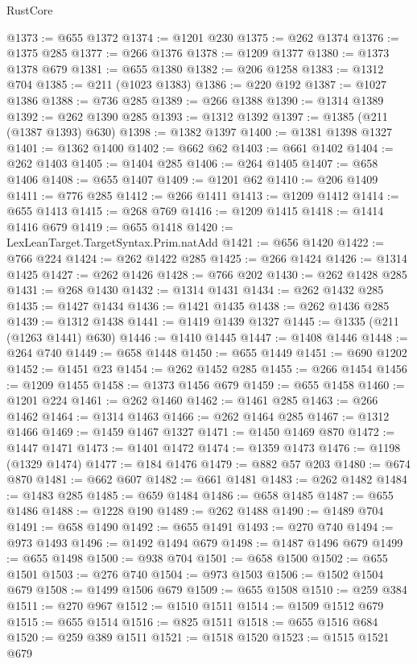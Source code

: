 \begin{lexlean}{RustCore}
\begin{coremodule}
@1373 := @655 @1372
@1374 := @1201 @230
@1375 := @262 @1374
@1376 := @1375 @285
@1377 := @266 @1376
@1378 := @1209 @1377
@1380 := @1373 @1378 @679
@1381 := @655 @1380
@1382 := @206 @1258
@1383 := @1312 @704
@1385 := @211 (@1023 @1383)
@1386 := @220 @192
@1387 := @1027 @1386
@1388 := @736 @285
@1389 := @266 @1388
@1390 := @1314 @1389
@1392 := @262 @1390 @285
@1393 := @1312 @1392
@1397 := @1385 (@211 (@1387 @1393) @630)
@1398 := @1382 @1397
@1400 := @1381 @1398 @1327
@1401 := @1362 @1400
@1402 := @662 @62
@1403 := @661 @1402
@1404 := @262 @1403
@1405 := @1404 @285
@1406 := @264 @1405
@1407 := @658 @1406
@1408 := @655 @1407
@1409 := @1201 @62
@1410 := @206 @1409
@1411 := @776 @285
@1412 := @266 @1411
@1413 := @1209 @1412
@1414 := @655 @1413
@1415 := @268 @769
@1416 := @1209 @1415
@1418 := @1414 @1416 @679
@1419 := @655 @1418
@1420 := LexLeanTarget.TargetSyntax.Prim.natAdd
@1421 := @656 @1420
@1422 := @766 @224
@1424 := @262 @1422 @285
@1425 := @266 @1424
@1426 := @1314 @1425
@1427 := @262 @1426
@1428 := @766 @202
@1430 := @262 @1428 @285
@1431 := @268 @1430
@1432 := @1314 @1431
@1434 := @262 @1432 @285
@1435 := @1427 @1434
@1436 := @1421 @1435
@1438 := @262 @1436 @285
@1439 := @1312 @1438
@1441 := @1419 @1439 @1327
@1445 := @1335 (@211 (@1263 @1441) @630)
@1446 := @1410 @1445
@1447 := @1408 @1446
@1448 := @264 @740
@1449 := @658 @1448
@1450 := @655 @1449
@1451 := @690 @1202
@1452 := @1451 @23
@1454 := @262 @1452 @285
@1455 := @266 @1454
@1456 := @1209 @1455
@1458 := @1373 @1456 @679
@1459 := @655 @1458
@1460 := @1201 @224
@1461 := @262 @1460
@1462 := @1461 @285
@1463 := @266 @1462
@1464 := @1314 @1463
@1466 := @262 @1464 @285
@1467 := @1312 @1466
@1469 := @1459 @1467 @1327
@1471 := @1450 @1469 @870
@1472 := @1447 @1471
@1473 := @1401 @1472
@1474 := @1359 @1473
@1476 := @1198 (@1329 @1474)
@1477 := @184 @1476
@1479 := @882 @57 @203
@1480 := @674 @870
@1481 := @662 @607
@1482 := @661 @1481
@1483 := @262 @1482
@1484 := @1483 @285
@1485 := @659 @1484
@1486 := @658 @1485
@1487 := @655 @1486
@1488 := @1228 @190
@1489 := @262 @1488
@1490 := @1489 @704
@1491 := @658 @1490
@1492 := @655 @1491
@1493 := @270 @740
@1494 := @973 @1493
@1496 := @1492 @1494 @679
@1498 := @1487 @1496 @679
@1499 := @655 @1498
@1500 := @938 @704
@1501 := @658 @1500
@1502 := @655 @1501
@1503 := @276 @740
@1504 := @973 @1503
@1506 := @1502 @1504 @679
@1508 := @1499 @1506 @679
@1509 := @655 @1508
@1510 := @259 @384
@1511 := @270 @967
@1512 := @1510 @1511
@1514 := @1509 @1512 @679
@1515 := @655 @1514
@1516 := @825 @1511
@1518 := @655 @1516 @684
@1520 := @259 @389 @1511
@1521 := @1518 @1520
@1523 := @1515 @1521 @679

\end{coremodule}
\end{lexlean}
